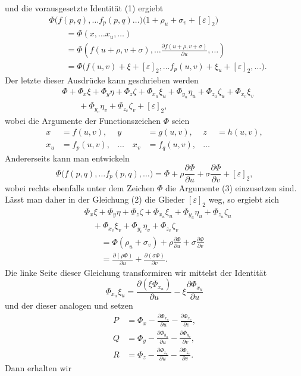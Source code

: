 \documentclass[11pt,a4paper,leqno]{article}
\begin{document}
und die vorausgesetzte Identität (1) ergiebt
\begin{equation}\tag{2}
\begin{aligned}
&\Phi\bigl(f(p,q),\ldots f_p(p,q)\ldots\bigr)
\bigl(1+\rho_u+\sigma_v+[\varepsilon]_2\bigr)\\
&\qquad=\Phi(x,\ldots x_u,\ldots)\\
&\qquad=\Phi\left(
f(u+\rho,v+\sigma),\ldots
\frac{\partial f(u+\rho,v+\sigma)}{\partial u},\ldots
\right)\\
&\qquad=\Phi\bigl(
f(u,v)+\xi+[\varepsilon]_2,\ldots
f_p(u,v)+\xi_u+[\varepsilon]_2,\ldots
\bigr).
\end{aligned}
\end{equation}
Der letzte dieser Ausdrücke kann geschrieben werden
\[
\begin{aligned}
&\Phi+\Phi_x\xi+\Phi_y\eta+\Phi_z\zeta
+\Phi_{x_u}\xi_u+\Phi_{y_u}\eta_u+\Phi_{z_u}\zeta_u
+\Phi_{x_v}\xi_v\\
&\qquad+\Phi_{y_v}\eta_v+\Phi_{z_v}\zeta_v+[\varepsilon]_2,
\end{aligned}
\]
wobei die Argumente der Functionszeichen $\Phi$ seien
\begin{equation}\tag{3}
\begin{aligned}
x&=f(u,v),&y&=g(u,v),&z&=h(u,v),\\
x_u&=f_p(u,v),&\ldots\quad x_v&=f_q(u,v),&\ldots
\end{aligned}
\end{equation}
Andererseits kann man entwickeln
\[
\Phi\bigl(f(p,q),\ldots f_p(p,q),\ldots\bigr)
=\Phi+\rho\frac{\partial\Phi}{\partial u}
+\sigma\frac{\partial\Phi}{\partial v}+[\varepsilon]_2,
\]
wobei rechts ebenfalls unter dem Zeichen $\Phi$ die Argumente (3) einzusetzen sind. Lässt man daher in der Gleichung (2) die Glieder $[\varepsilon]_2$ weg, so ergiebt sich
\[
\begin{aligned}
&\Phi_x\xi+\Phi_y\eta+\Phi_z\zeta
+\Phi_{x_u}\xi_u+\Phi_{y_u}\eta_u+\Phi_{z_u}\zeta_u\\
&\quad+\Phi_{x_v}\xi_v+\Phi_{y_v}\eta_v+\Phi_{z_v}\zeta_v\\
&\qquad=\Phi(\rho_u+\sigma_v)
+\rho\frac{\partial\Phi}{\partial u}
+\sigma\frac{\partial\Phi}{\partial v}\\
&\qquad=\frac{\partial(\rho\Phi)}{\partial u}
+\frac{\partial(\sigma\Phi)}{\partial v}.
\end{aligned}
\]
Die linke Seite dieser Gleichung transformiren wir mittelst der Identität
\[
\Phi_{x_u}\xi_u
=\frac{\partial(\xi\Phi_{x_u})}{\partial u}
-\xi\frac{\partial\Phi_{x_u}}{\partial u}
\]
und der dieser analogen und setzen
\[
\begin{aligned}
P&=\Phi_x-\frac{\partial\Phi_{x_u}}{\partial u}
-\frac{\partial\Phi_{x_v}}{\partial v},\\
Q&=\Phi_y-\frac{\partial\Phi_{y_u}}{\partial u}
-\frac{\partial\Phi_{y_v}}{\partial v},\\
R&=\Phi_z-\frac{\partial\Phi_{z_u}}{\partial u}
-\frac{\partial\Phi_{z_v}}{\partial v}.
\end{aligned}
\]
Dann erhalten wir
\end{document}
